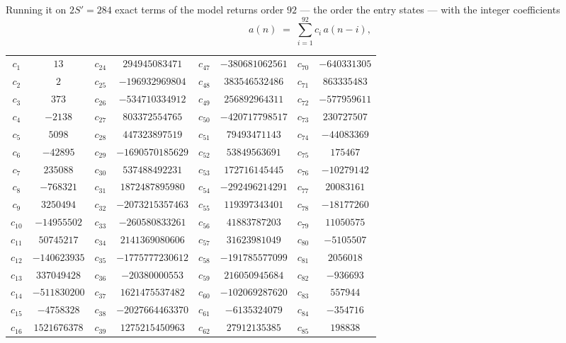 \documentclass[11pt,a4paper]{article}
\theoremstyle{plain}
\theoremstyle{definition}
\begin{document}
Running it on $2S'=284$ exact terms of the model returns order $92$ --- the order the
entry states --- with the integer coefficients
\[
a(n)\;=\;\sum_{i=1}^{92}c_i\,a(n-i),
\]
\begin{center}\small
\begin{tabular}{cccccccc}
$c_{1}$ & $13$ & $c_{24}$ & $294945083471$ & $c_{47}$ & $-380681062561$ & $c_{70}$ & $-640331305$ \\
$c_{2}$ & $2$ & $c_{25}$ & $-196932969804$ & $c_{48}$ & $383546532486$ & $c_{71}$ & $863335483$ \\
$c_{3}$ & $373$ & $c_{26}$ & $-534710334912$ & $c_{49}$ & $256892964311$ & $c_{72}$ & $-577959611$ \\
$c_{4}$ & $-2138$ & $c_{27}$ & $803372554765$ & $c_{50}$ & $-420717798517$ & $c_{73}$ & $230727507$ \\
$c_{5}$ & $5098$ & $c_{28}$ & $447323897519$ & $c_{51}$ & $79493471143$ & $c_{74}$ & $-44083369$ \\
$c_{6}$ & $-42895$ & $c_{29}$ & $-1690570185629$ & $c_{52}$ & $53849563691$ & $c_{75}$ & $175467$ \\
$c_{7}$ & $235088$ & $c_{30}$ & $537488492231$ & $c_{53}$ & $172716145445$ & $c_{76}$ & $-10279142$ \\
$c_{8}$ & $-768321$ & $c_{31}$ & $1872487895980$ & $c_{54}$ & $-292496214291$ & $c_{77}$ & $20083161$ \\
$c_{9}$ & $3250494$ & $c_{32}$ & $-2073215357463$ & $c_{55}$ & $119397343401$ & $c_{78}$ & $-18177260$ \\
$c_{10}$ & $-14955502$ & $c_{33}$ & $-260580833261$ & $c_{56}$ & $41883787203$ & $c_{79}$ & $11050575$ \\
$c_{11}$ & $50745217$ & $c_{34}$ & $2141369080606$ & $c_{57}$ & $31623981049$ & $c_{80}$ & $-5105507$ \\
$c_{12}$ & $-140623935$ & $c_{35}$ & $-1775777230612$ & $c_{58}$ & $-191785577099$ & $c_{81}$ & $2056018$ \\
$c_{13}$ & $337049428$ & $c_{36}$ & $-20380000553$ & $c_{59}$ & $216050945684$ & $c_{82}$ & $-936693$ \\
$c_{14}$ & $-511830200$ & $c_{37}$ & $1621475537482$ & $c_{60}$ & $-102069287620$ & $c_{83}$ & $557944$ \\
$c_{15}$ & $-4758328$ & $c_{38}$ & $-2027664463370$ & $c_{61}$ & $-6135324079$ & $c_{84}$ & $-354716$ \\
$c_{16}$ & $1521676378$ & $c_{39}$ & $1275215450963$ & $c_{62}$ & $27912135385$ & $c_{85}$ & $198838$ \\

\end{tabular}
\end{center}
\end{document}

